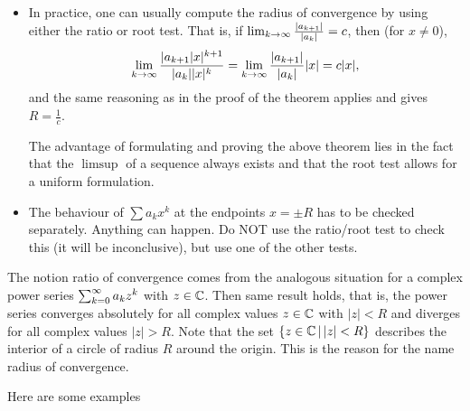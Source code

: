 \documentclass[10pt, a4paper]{article}
\newcommand{\infsumo}{\infsum[k = 0]}
\begin{document}
\begin{remark}\phantom{}
    \begin{itemize}
        \item In practice,
        one can usually compute the radius of convergence by using either the ratio or root test.
        That is,
        if $\liminfty[k]\frac{|a_{k + 1}|}{|a_k|} = c$,
        then (for $x \neq 0$),
        \[
        \liminfty[k]\frac{|a_{k + 1}|x| ^ {k + 1}}{|a_k||x| ^ k} = \liminfty[k]\frac{|a_{k + 1}|}{|a_k|}|x| = c|x|,
        \]
        and the same reasoning as in the proof of the theorem applies and gives $R = \frac{1}{c}$.

        The advantage of formulating and proving the above theorem lies in the fact that the $\limsup$ of a sequence always exists and that the root test allows for a uniform formulation.

        \item The behaviour of $\sum a_kx ^ k$ at the endpoints $x = \pm R$ has to be checked separately.
        Anything can happen.
        Do NOT use the ratio/root test to check this
        (it will be inconclusive),
        but use one of the other tests.
    \end{itemize}
\end{remark}

\begin{remark}
    The notion ratio of convergence comes from the analogous situation for a complex power series $\infsumo a_kz ^ k$ with $z \in \C$.
    Then same result holds,
    that is,
    the power series converges absolutely for all complex values $z \in \C$ with $|z| < R$ and diverges for all complex values $|z| > R$.
    Note that the set $\{z \in \C\,|\, |z| < R\}$ describes the interior of a circle of radius $R$ around the origin.
    This is the reason for the name radius of convergence.
\end{remark}

Here are some examples
\end{document}

